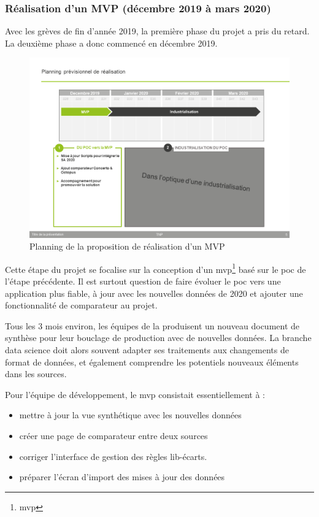 \subsubsection{Réalisation d'un MVP (décembre 2019 à mars 2020)}

Avec les grèves de fin d'année 2019, la première phase du projet a pris du retard. La deuxième phase a donc commencé en décembre 2019.

\begin{figure}[H]
    \centering
    \includegraphics[width=1\linewidth]{img/planning-decembre-mars-2020-MVP.png}
    \caption{Planning de la proposition de réalisation d’un MVP}
\end{figure}

Cette étape du projet se focalise sur la conception d'un 
\gls{mvp}\footnote{\glsdesc{mvp}}
basé sur le \gls{poc} de l'étape précédente. Il est surtout question de faire évoluer le \gls{poc} vers une application plus fiable, à jour avec les nouvelles données de 2020 et ajouter une fonctionnalité de comparateur au projet.

Tous les 3 mois environ, les équipes de la \sncf produisent un nouveau document de synthèse pour leur bouclage de production avec de nouvelles données. La branche data science doit alors souvent adapter ses traitements aux changements de format de données, et également comprendre les potentiels nouveaux éléments dans les sources.

Pour l'équipe de développement, le \gls{mvp} consistait essentiellement à :

\begin{itemize}
    \item mettre à jour la vue synthétique avec les nouvelles données
    \item créer une page de comparateur entre deux sources
    \item corriger l'interface de gestion des règles lib-écarts.
    \item préparer l'écran d'import des mises à jour des données
\end{itemize}

